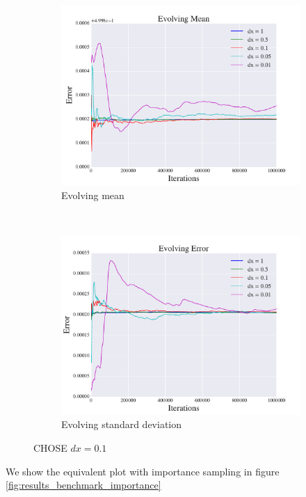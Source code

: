 \documentclass[a4paper, 10pt]{article}
\begin{document}
\begin{figure}[ht!]
\centering
 \begin{subfigure}[b]{0.8\textwidth}
 	\centering
 	\includegraphics[width=\textwidth]{../Results/dx_normal_mean.pdf}
 	\caption{Evolving mean}
 \end{subfigure}
 ~
 \begin{subfigure}[b]{0.8\textwidth}
 	 	\centering
 	 	\includegraphics[width=\textwidth]{../Results/dx_normal.pdf}
 	 	\caption{Evolving standard deviation}
\end{subfigure}
\caption{CHOSE $dx=0.1$}\label{fig:results_benchmark_no_importance}
\end{figure}
We show the equivalent plot with importance sampling in figure \ref{fig:results_benchmark_importance}
\end{document}

